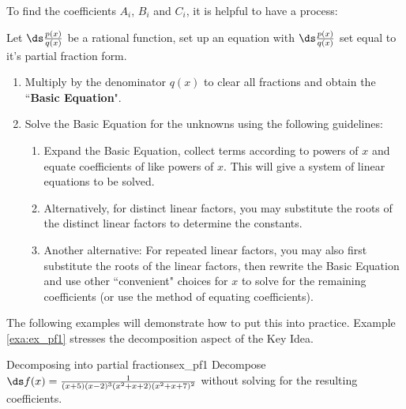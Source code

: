 To find the coefficients $A_i$, $B_i$ and $C_i$, it is helpful to have a process:

\begin{formulabox} \label{idea:partial_fraction2}
Let $\ds \frac{p(x)}{q(x)}$ be a rational function, set up an equation with $\ds \frac{p(x)}{q(x)}$ set equal to it's partial fraction form.
\begin{enumerate}
	\item	Multiply by the denominator $ q(x) $ to clear all fractions and obtain the 	``\textbf{Basic Equation}".
	
	\item	Solve the Basic Equation for the unknowns using the following guidelines:
	
	\begin{enumerate}
	\item Expand the Basic Equation, collect terms according to powers of $ x $ and equate coefficients of like powers of $ x $. This will give a system of linear equations to be solved.
	\item	Alternatively, for distinct linear factors, you may substitute the roots of the distinct linear factors
	to determine the constants.
	\item Another alternative: For repeated linear factors, you may also first substitute the roots of the linear factors, then rewrite the Basic Equation and use other “convenient" choices for $ x $ to solve for the remaining
	coefficients (or use the method of equating coefficients).
	\end{enumerate}
\end{enumerate}	
\end{formulabox}



The following examples will demonstrate how to put this into practice. Example \ref{exa:ex_pf1} stresses the decomposition aspect of the Key Idea.\\

\begin{example}{Decomposing into partial fractions}{ex_pf1}
{
Decompose $\ds f(x)=\frac{1}{(x+5)(x-2)^3(x^2+x+2)(x^2+x+7)^2}$ without solving for the resulting coefficients.}
\end{example}


